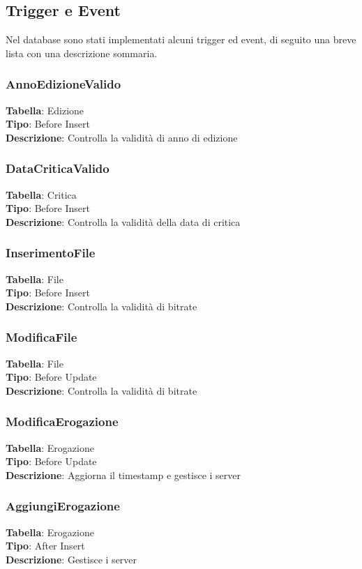 \documentclass{article}
\begin{document}
\subsection{Trigger e Event}
Nel database sono stati implementati alcuni trigger ed event, di seguito una breve lista con una descrizione sommaria.
\subsubsection{AnnoEdizioneValido}
\textbf{Tabella}: Edizione \\
\textbf{Tipo}: Before Insert\\
\textbf{Descrizione}: Controlla la validità di anno di edizione \\
\subsubsection{DataCriticaValido}
\textbf{Tabella}: Critica \\
\textbf{Tipo}: Before Insert\\
\textbf{Descrizione}: Controlla la validità della data di critica \\
\subsubsection{InserimentoFile}
\textbf{Tabella}: File \\
\textbf{Tipo}: Before Insert\\
\textbf{Descrizione}: Controlla la validità di bitrate \\
\subsubsection{ModificaFile}
\textbf{Tabella}: File \\
\textbf{Tipo}: Before Update\\
\textbf{Descrizione}: Controlla la validità di bitrate \\
\subsubsection{ModificaErogazione}
\textbf{Tabella}: Erogazione\\
\textbf{Tipo}: Before Update\\
\textbf{Descrizione}: Aggiorna il timestamp e gestisce i server\\
\subsubsection{AggiungiErogazione}
\textbf{Tabella}: Erogazione \\
\textbf{Tipo}: After Insert \\
\textbf{Descrizione}: Gestisce i server \\
\end{document}
